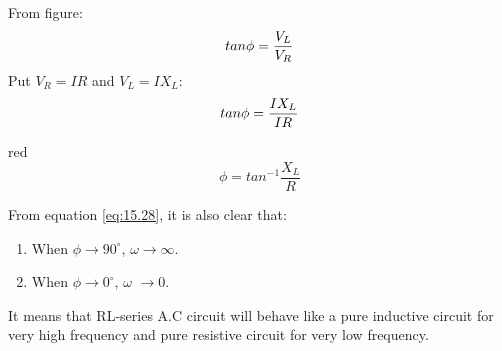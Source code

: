 From figure:
\begin{equation}\notag
    tan \phi =\frac{V_{L}}{V_{R}}
\end{equation}
Put $V_{R}=IR$ and $V_{L}=IX_{L}$:
\begin{equation}\notag
    tan \phi =\frac{IX_{L}}{IR}
\end{equation}
\begin{mybox}{red}{}
\begin{equation}\label{eq:15.28}
      \phi =tan^{-1}\frac{X_{L}}{R}
\end{equation}
\end{mybox}
\noindent From equation \ref{eq:15.28}, it is also clear that:
\begin{enumerate}[label = (\roman*)]
    \item When $\phi\rightarrow 90^{\circ}$, $\omega\rightarrow\infty$.
    \item When $\phi\rightarrow 0^{\circ}$, $\omega$ $\rightarrow 0$.
\end{enumerate}
It means that RL-series A.C circuit will behave like a pure inductive
circuit for very high frequency and pure resistive circuit for very low
frequency.
